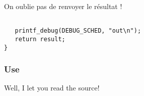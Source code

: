    On oublie pas de renvoyer le résultat !

\begin{verbatim}

   printf_debug(DEBUG_SCHED, "out\n");
   return result;
}
\end{verbatim}

%
\subsubsection{Use}

   Well, I let you read the source!

